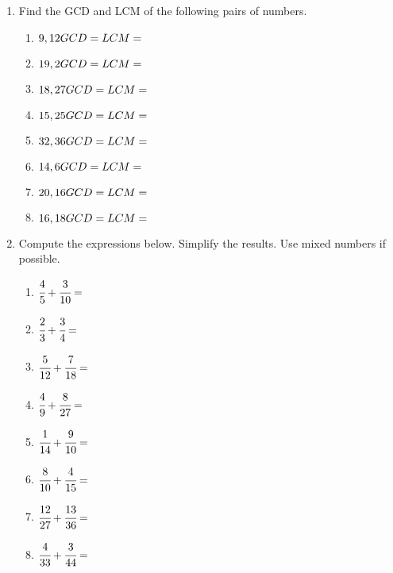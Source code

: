 \documentclass[12pt,letterpaper]{article}
\author{Shawn Ma}
\date{\today}
\begin{document}
\setlength{\parindent}{0pt}

\begin{enumerate}
    \item Find the GCD and LCM of the following pairs of numbers.
    \begin{multicols}{2}
    \begin{enumerate}
        \item $9,12\\GCD=\\LCM=$
        \item $19,2\\GCD=\\LCM=$
        \item $18,27\\GCD=\\LCM=$
        \item $15,25\\GCD=\\LCM=$
        \item $32,36\\GCD=\\LCM=$
        \item $14,6\\GCD=\\LCM=$
        \item $20,16\\GCD=\\LCM=$
        \item $16,18\\GCD=\\LCM=$
    \end{enumerate}
    \end{multicols}

    \item Compute the expressions below. Simplify the results. Use mixed numbers if possible.
    \begin{multicols}{2}
    \begin{enumerate}
        \item $\cfrac{4}{5}+\cfrac{3}{10}=$
        \item $\cfrac{2}{3}+\cfrac{3}{4}=$
        \item $\cfrac{5}{12}+\cfrac{7}{18}=$
        \item $\cfrac{4}{9}+\cfrac{8}{27}=$
        \item $\cfrac{1}{14}+\cfrac{9}{10}=$
        \item $\cfrac{8}{10}+\cfrac{4}{15}=$
        \item $\cfrac{12}{27}+\cfrac{13}{36}=$
        \item $\cfrac{4}{33}+\cfrac{3}{44}=$
    \end{enumerate}
    \end{multicols}


\end{enumerate}
\end{document}
